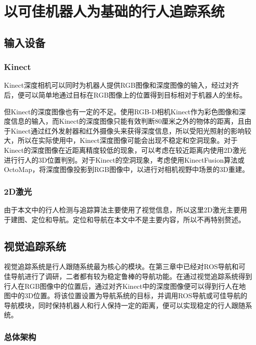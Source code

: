 
\chapter{以可佳机器人为基础的行人追踪系统}

\section{输入设备}

\subsection{Kinect}

  Kinect深度相机可以同时为机器人提供RGB图像和深度图像的输入，经过对齐后，便可以简单地通过目标在RGB图像上的位置得到目标相对于机器人的坐标。

  但Kinect的深度图像也有一定的不足。使用RGB-D相机Kinect作为彩色图像和深度信息的输入，而Kinect的深度图像只能有效判断80厘米之外的物体的距离，且由于Kinect通过红外发射器和红外摄像头来获得深度信息，所以受阳光照射的影响较大，所以在实际使用中，Kinect深度图像可能会出现不稳定和空洞现象。对于Kinect的深度图像在近距离精度较低的现象，可以考虑在较近距离内使用2D激光进行行人的3D位置判别。对于Kinect的空洞现象，考虑使用KinectFusion算法\cite{newcombe2011kinectfusion}或OctoMap\cite{hornung2013octomap}，将深度图像投影到RGB图像中，以进行对相机视野中场景的3D重建。

\subsection{2D激光}

  由于本文中的行人检测与追踪算法主要使用了视觉信息，所以这里2D激光主要用于建图、定位和导航。定位和导航在本文中不是主要内容，所以不再特别赘述。

\section{视觉追踪系统}

  视觉追踪系统是行人跟随系统最为核心的模块。在第三章中已经对ROS导航和可佳导航进行了调研，二者都有较为稳定鲁棒的导航功能。在通过视觉追踪系统得到行人在RGB图像中的位置后，通过对齐Kinect中的深度图像便可以得到行人在地图中的3D位置。将该位置设置为导航系统的目标，并调用ROS导航或可佳导航的导航模块，同时保持机器人和行人保持一定的距离，便可以实现稳定的行人跟随系统。

\subsection{总体架构}

